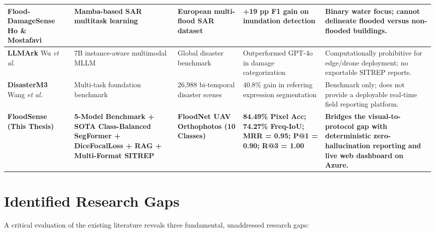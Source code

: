 \begin{table}[p]
{\begin{tabular}{p{2.6cm} p{3.0cm} p{2.5cm} p{3.0cm} p{3.6cm}}
\midrule
\textbf{Flood-DamageSense} \newline Ho \& Mostafavi~\cite{flood_damagesense2025} & Mamba-based SAR multitask learning & European multi-flood SAR dataset & +19 pp F1 gain on inundation detection & Binary water focus; cannot delineate flooded versus non-flooded buildings. \\
\midrule
\textbf{LLMArk} \newline Wu \textit{et al.}~\cite{llmark2025} & 7B instance-aware multimodal MLLM & Global disaster benchmark & Outperformed GPT-4o in damage categorization & Computationally prohibitive for edge/drone deployment; no exportable SITREP reports. \\
\midrule
\textbf{DisasterM3} \newline Wang \textit{et al.}~\cite{disasterm3_2025} & Multi-task foundation benchmark & 26,988 bi-temporal disaster scenes & 40.8\% gain in referring expression segmentation & Benchmark only; does not provide a deployable real-time field reporting platform. \\
\midrule
\textbf{FloodSense} \newline \textbf{(This Thesis)} & \textbf{5-Model Benchmark + SOTA Class-Balanced SegFormer + DiceFocalLoss + RAG + Multi-Format SITREP} & \textbf{FloodNet UAV Orthophotos (10 Classes)} & \textbf{84.49\% Pixel Acc; 74.27\% Freq-IoU; MRR = 0.95; P@1 = 0.90; R@3 = 1.00} & \textbf{Bridges the visual-to-protocol gap with deterministic zero-hallucination reporting and live web dashboard on Azure.} \\
\bottomrule
\end{tabular}%
}
\end{table}

\section{Identified Research Gaps}
A critical evaluation of the existing literature reveals three fundamental, unaddressed research gaps:

